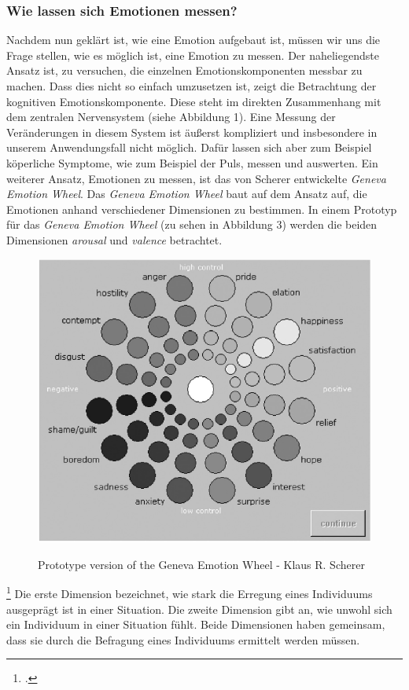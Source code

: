 \subsubsection{Wie lassen sich Emotionen messen?}
Nachdem nun geklärt ist, wie eine Emotion aufgebaut ist, müssen wir uns die Frage stellen, wie es möglich ist, eine Emotion zu messen. Der naheliegendste Ansatz ist, zu versuchen, die einzelnen Emotionskomponenten messbar zu machen. Dass dies nicht so einfach umzusetzen ist, zeigt die Betrachtung der kognitiven Emotionskomponente. Diese steht im direkten Zusammenhang mit dem zentralen Nervensystem (siehe Abbildung 1). Eine Messung der Veränderungen in diesem System ist äußerst kompliziert und insbesondere in unserem Anwendungsfall nicht möglich. Dafür lassen sich aber zum Beispiel köperliche Symptome, wie zum Beispiel der Puls, messen und auswerten.\newline
Ein weiterer Ansatz, Emotionen zu messen, ist das von Scherer entwickelte \textit{Geneva Emotion Wheel}. Das \textit{Geneva Emotion Wheel} baut auf dem Ansatz auf, die Emotionen anhand verschiedener Dimensionen zu bestimmen. In einem Prototyp für das \textit{Geneva Emotion Wheel} (zu sehen in Abbildung 3) werden die beiden Dimensionen \textit{arousal} und \textit{valence} betrachtet.
\begin{figure}[h]
	\centering
	\includegraphics[width=12cm]{Bilder/Geneva-Emotion-Wheel.png}
	\label{img:Geneva}
	\caption[Prototype version of the Geneva Emotion Wheel - Klaus R. Scherer]{Prototype version of the Geneva Emotion Wheel - Klaus R. Scherer\footnotemark}
\end{figure}%
\footcitetext[Vgl.][S.723 Figure 2]{Kla05}
\newline
Die erste Dimension bezeichnet, wie stark die Erregung eines Individuums ausgeprägt ist in einer Situation. Die zweite Dimension gibt an, wie unwohl sich ein Individuum in einer Situation fühlt. Beide Dimensionen haben gemeinsam, dass sie durch die Befragung eines Individuums ermittelt werden müssen. 
